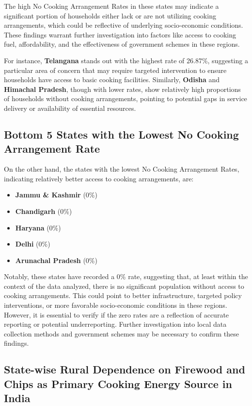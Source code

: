 \documentclass{article}
\begin{document}
The high No Cooking Arrangement Rates in these states may indicate a significant portion of households either lack or are not utilizing cooking arrangements, which could be reflective of underlying socio-economic conditions. These findings warrant further investigation into factors like access to cooking fuel, affordability, and the effectiveness of government schemes in these regions.

For instance, \textbf{Telangana} stands out with the highest rate of 26.87\%, suggesting a particular area of concern that may require targeted intervention to ensure households have access to basic cooking facilities. Similarly, \textbf{Odisha} and \textbf{Himachal Pradesh}, though with lower rates, show relatively high proportions of households without cooking arrangements, pointing to potential gaps in service delivery or availability of essential resources.

\subsection*{Bottom 5 States with the Lowest No Cooking Arrangement Rate}

On the other hand, the states with the lowest No Cooking Arrangement Rates, indicating relatively better access to cooking arrangements, are:

\begin{itemize}
	\item \textbf{Jammu \& Kashmir} (0\%)
	\item \textbf{Chandigarh} (0\%)
	\item \textbf{Haryana} (0\%)
	\item \textbf{Delhi} (0\%)
	\item \textbf{Arunachal Pradesh} (0\%)
\end{itemize}

Notably, these states have recorded a 0\% rate, suggesting that, at least within the context of the data analyzed, there is no significant population without access to cooking arrangements. This could point to better infrastructure, targeted policy interventions, or more favorable socio-economic conditions in these regions. However, it is essential to verify if the zero rates are a reflection of accurate reporting or potential underreporting. Further investigation into local data collection methods and government schemes may be necessary to confirm these findings.




\subsection{State-wise Rural Dependence on Firewood and Chips as Primary Cooking Energy Source in India}
\end{document}
